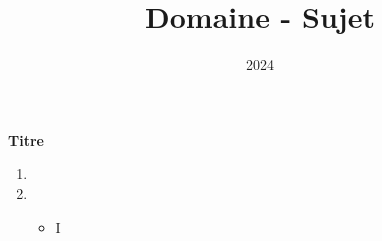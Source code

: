 \documentclass[10pt,a4paper]{article}
\title{Domaine - Sujet}
\author{}
\date{2024}
\begin{document}
\q \textbf{Titre}

\begin{enumerate}
    \item

    \item
    \begin{itemize}
        \item I
    \end{itemize}
\end{enumerate}
\end{document}
